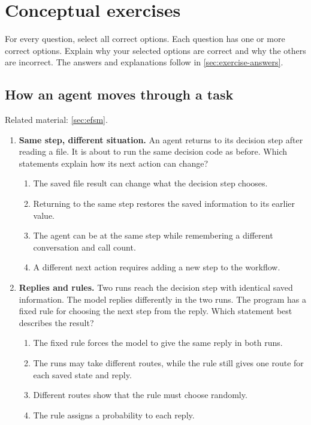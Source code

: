 \section{Conceptual exercises}
\label{sec:exercises}

For every question, select all correct options. Each question has one or more correct
options. Explain why your selected options are correct and why the others are incorrect.
The answers and explanations follow in \cref{sec:exercise-answers}.

\subsection{How an agent moves through a task}
\noindent Related material: \cref{sec:efsm}.

\begin{enumerate}[start=1,itemsep=0.7\baselineskip]
\item\label{exercise:1} \begin{minipage}[t]{\linewidth}
\textbf{Same step, different situation.} An agent returns to its decision step after reading a file. It is about to run the same decision code as before. Which statements explain how its next action can change?
\begin{enumerate}[label=\textnormal{(\Alph*)},leftmargin=*,itemsep=0pt]
\item The saved file result can change what the decision step chooses.
\item Returning to the same step restores the saved information to its earlier value.
\item The agent can be at the same step while remembering a different conversation and call count.
\item A different next action requires adding a new step to the workflow.
\end{enumerate}
\end{minipage}

\item\label{exercise:2} \begin{minipage}[t]{\linewidth}
\textbf{Replies and rules.} Two runs reach the decision step with identical saved information. The model replies differently in the two runs. The program has a fixed rule for choosing the next step from the reply. Which statement best describes the result?
\begin{enumerate}[label=\textnormal{(\Alph*)},leftmargin=*,itemsep=0pt]
\item The fixed rule forces the model to give the same reply in both runs.
\item The runs may take different routes, while the rule still gives one route for each saved state and reply.
\item Different routes show that the rule must choose randomly.
\item The rule assigns a probability to each reply.
\end{enumerate}
\end{minipage}


\end{enumerate}
